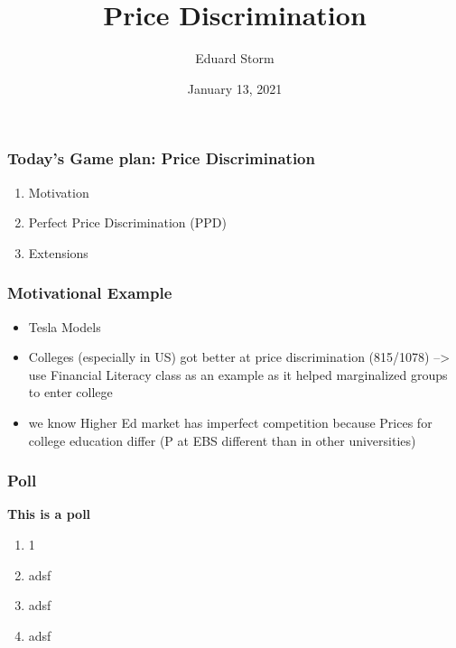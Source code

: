 \documentclass[10pt]{beamer}
\title[Task Specialization \& NF Wage Gap]{Price Discrimination} %
\author{Eduard Storm} %
\institute[estorm@carleton.edu]
{
	
	
	\medskip 
	
	Department of Economics \\  
	Carleton College \\ %
	\textit{estorm@carleton.edu} %
	
	\bigskip
	
	 Job Market Paper Presentation for: \\
		\smallskip
	EBS University of Business and Law
}
\date{January 13, 2021} %
\begin{document}
\begin{frame}
\titlepage %
\end{frame}


\begin{frame} 
	\frametitle{Today's Game plan: Price Discrimination}
	
	
	\begin{enumerate}
		\item Motivation
		\item Perfect Price Discrimination (PPD)
		\item Extensions
	\end{enumerate}
	
	
\end{frame}
\begin{frame} 
	\frametitle{Motivational Example}
	
	
\begin{itemize}
	\item Tesla Models
	\item Colleges (especially in US) got better at price discrimination (815/1078) --> use Financial Literacy class as an example as it helped marginalized groups to enter college
	\item we know Higher Ed market has imperfect competition because Prices for college education differ (P at EBS different than in other universities)
\end{itemize}
	
	
\end{frame}

\begin{frame} 
	\frametitle{Poll}
	
\begin{center}
	\textbf{This is a poll}
\end{center}	

	
\begin{enumerate}%
	\item 	1
	\item adsf
	\item adsf
	\item adsf
\end{enumerate}
	
\end{frame}
\end{document}
